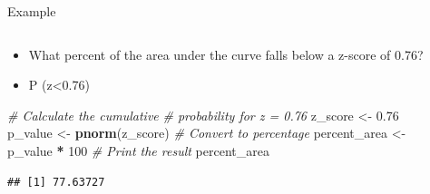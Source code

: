 \documentclass[
  ignorenonframetext,
]{beamer}
\newenvironment{Shaded}{\begin{snugshade}}{\end{snugshade}}
\newcommand{\CommentTok}[1]{\textcolor[rgb]{0.56,0.35,0.01}{\textit{#1}}}
\newcommand{\DecValTok}[1]{\textcolor[rgb]{0.00,0.00,0.81}{#1}}
\newcommand{\FloatTok}[1]{\textcolor[rgb]{0.00,0.00,0.81}{#1}}
\newcommand{\FunctionTok}[1]{\textcolor[rgb]{0.13,0.29,0.53}{\textbf{#1}}}
\newcommand{\NormalTok}[1]{#1}
\newcommand{\OtherTok}[1]{\textcolor[rgb]{0.56,0.35,0.01}{#1}}
\newcommand{\SpecialCharTok}[1]{\textcolor[rgb]{0.81,0.36,0.00}{\textbf{#1}}}
\providecommand{\tightlist}{%
  \setlength{\itemsep}{0pt}\setlength{\parskip}{0pt}}
\begin{document}
\begin{frame}[fragile]{Example}
\label{example-2}
\begin{columns}[T]
\begin{column}{0.5\textwidth}
\vspace{1.5cm}

\begin{itemize}
\tightlist
\item
  What percent of the area under the curve falls below a z-score of
  0.76?
\end{itemize}

\begin{itemize}
\tightlist
\item
  P (z\textless0.76)
\end{itemize}

\begin{Shaded}
\begin{Highlighting}[]
\CommentTok{\# Calculate the cumulative }
\CommentTok{\# probability for z = 0.76}
\NormalTok{z\_score }\OtherTok{\textless{}{-}} \FloatTok{0.76}
\NormalTok{p\_value }\OtherTok{\textless{}{-}} \FunctionTok{pnorm}\NormalTok{(z\_score)}
\CommentTok{\# Convert to percentage}
\NormalTok{percent\_area }\OtherTok{\textless{}{-}}\NormalTok{ p\_value }\SpecialCharTok{*} \DecValTok{100}
\CommentTok{\# Print the result}
\NormalTok{percent\_area}
\end{Highlighting}
\end{Shaded}

\begin{verbatim}
## [1] 77.63727
\end{verbatim}
\end{column}

\begin{column}{0.5\textwidth}
\vspace{1cm}


\end{column}
\end{columns}
\end{frame}
\end{document}
